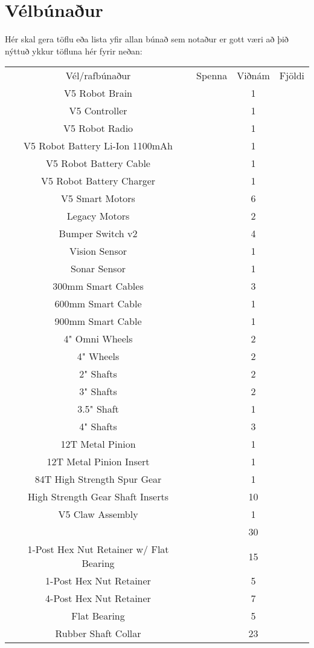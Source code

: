 \section{Vélbúnaður}
Hér skal gera töflu eða lista yfir allan búnað sem notaður er gott væri að þið nýttuð ykkur töfluna hér fyrir neðan:

\begin{center}
\begin{tabular}{ |c|c|c|c| } 
 \hline
 Vél/rafbúnaður &Spenna &Viðnám &Fjöldi\\ 
 V5 Robot Brain & & 1\\
 V5 Controller& & 1\\ 
 V5 Robot Radio& & 1\\ 
 V5 Robot Battery Li-Ion 1100mAh& & 1\\ 
 V5 Robot Battery Cable& & 1\\ 
 V5 Robot Battery Charger& & 1\\ 
 V5 Smart Motors& & 6\\
 Legacy Motors & & 2\\
 Bumper Switch v2& & 4\\ 
 Vision Sensor& & 1\\
 Sonar Sensor& & 1\\
 300mm Smart Cables& & 3\\
 600mm Smart Cable& & 1\\
 900mm Smart Cable& & 1\\
 4" Omni Wheels& & 2\\
 4" Wheels& & 2\\
 2" Shafts& & 2\\
 3" Shafts& & 2\\
 3.5" Shaft& & 1\\
 4" Shafts& & 3\\
 12T Metal Pinion& & 1\\
 12T Metal Pinion Insert& & 1\\
 84T High Strength Spur Gear& & 1\\
 High Strength Gear Shaft Inserts& & 10\\
 V5 Claw Assembly& & 1\\
 #8-32 Hex Nut& & 30\\
 1-Post Hex Nut Retainer w/ Flat Bearing& & 15\\
 1-Post Hex Nut Retainer& & 5\\
 4-Post Hex Nut Retainer& & 7\\
 Flat Bearing& & 5\\
 Rubber Shaft Collar& & 23\\

\end{tabular}
\end{center}
